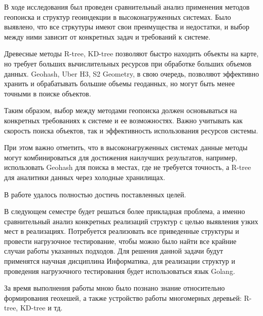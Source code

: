 \Conclusion

В ходе исследования был проведен сравнительный анализ применения методов геопоиска и структур геоиндекции в высоконагруженных системах. Было выявлено, что все стркутуры имеют свои преимущества и недостатки, и выбор между ними зависит от конкретных задач и требований к системе.

Древесные методы R-tree, KD-tree позволяют быстро находить объекты на карте, но требует больших вычислительных ресурсов при обработке больших объемов данных. Geohash, Uber H3, S2 Geometry, в свою очередь, позволяют эффективно хранить и обрабатывать большие объемы геоданных, но могут быть менее точными в поиске объектов.

Таким образом, выбор между методами геопоиска должен основываться на конкретных требованиях к системе и ее возможностях. Важно учитывать как скорость поиска объектов, так и эффективность использования ресурсов системы.

При этом важно отметить, что в высоконагруженных системах данные методы могут комбинироваться для достижения наилучших результатов, например, использовать Geohash для поиска в местах, где не требуется точность, а R-tree для аналитики данных через холодные хранилищах.

В работе удалось полностью достичь поставленных целей. 

В следующем семестре будет решаться более прикладная проблема, а именно сравнительный анализ конкретных реализаций структур с целью выявления узких мест в реализациях. Потребуется реализовать все приведенные структуры и провести нагрузочное тестирование, чтобы можно было найти все крайние случаи работы указанных подходов. Для решения данной задачи будут применятся научная дисциплина Информатика, для реализации структур и проведения нагрузочного тестирования будет использоваться язык Golang.

За время выполнения работы мною было познано знание относительно формирования геохешей, а также устройство работы многомерных деревьей: R-tree, KD-tree и тд.
